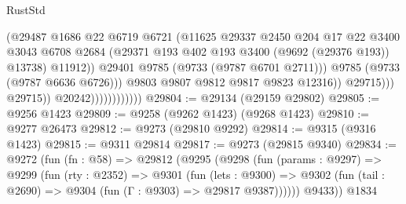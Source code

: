 \begin{lexlean}{RustStd}
\begin{coremodule}
{\begin{coremodule}
{{{{{{{{{{{{{{{{{{{{{{{{{{{{{{{{{{{{{{{{{{{{{{{{{{{{{{{                                              (@29487
                                                @1686
                                                @22
                                                @6719
                                                @6721
                                                (@11625
                                                  @29337
                                                  @2450
                                                  @204
                                                  @17
                                                  @22
                                                  @3400
                                                  @3043
                                                  @6708
                                                  @2684
                                                  (@29371
                                                    @193
                                                    @402
                                                    @193
                                                    @3400
                                                    (@9692 (@29376 @193))
                                                    @13738)
                                                  @11912))
                                              @29401
                                              @9785
                                              (@9733 (@9787 @6701 @2711)))
                                            @9785
                                            (@9733 (@9787 @6636 @6726)))
                                          @9803
                                          @9807
                                          @9812
                                          @9817
                                          @9823
                                          @12316))
                                      @29715)))
                                @29715))
                            @20242))))))))))))
@29804 := @29134 (@29159 @29802)
@29805 := @9256 @1423
@29809 := @9258 (@9262 @1423) (@9268 @1423)
@29810 := @9277 @26473
@29812 := @9273 (@29810 @9292)
@29814 := @9315 (@9316 @1423)
@29815 := @9311 @29814
@29817 := @9273 (@29815 @9340)
@29834 := @9272
    (fun (fn : @58) =>
    @29812
      (@9295
        (@9298
          (fun (params : @9297) =>
          @9299
            (fun (rty : @2352) =>
            @9301
              (fun (lets : @9300) =>
              @9302 (fun (tail : @2690) => @9304 (fun (Γ : @9303) => @29817 @9387))))))
        @9433))
    @1834
}}}}}}}}}}}}}}}}}}}}}}}}}}}}}}}}}}}}}}}}}}}}}}}}}}}}}}}
\end{coremodule}}
\end{coremodule}
\end{lexlean}
